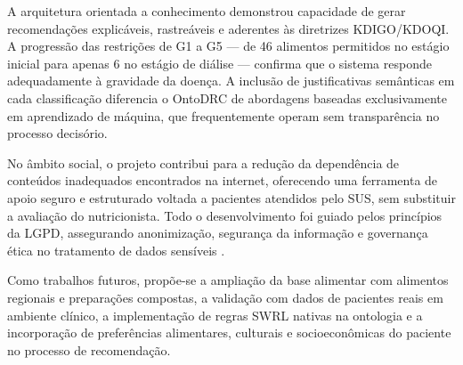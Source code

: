 \documentclass[12pt, a4paper, twocolumn]{article}
\begin{document}
A arquitetura orientada a conhecimento demonstrou capacidade de gerar recomendações explicáveis, rastreáveis e aderentes às diretrizes KDIGO/KDOQI. A progressão das restrições de G1 a G5 --- de 46 alimentos permitidos no estágio inicial para apenas 6 no estágio de diálise --- confirma que o sistema responde adequadamente à gravidade da doença. A inclusão de justificativas semânticas em cada classificação diferencia o OntoDRC de abordagens baseadas exclusivamente em aprendizado de máquina, que frequentemente operam sem transparência no processo decisório.

No âmbito social, o projeto contribui para a redução da dependência de conteúdos inadequados encontrados na internet, oferecendo uma ferramenta de apoio seguro e estruturado voltada a pacientes atendidos pelo SUS, sem substituir a avaliação do nutricionista. Todo o desenvolvimento foi guiado pelos princípios da LGPD, assegurando anonimização, segurança da informação e governança ética no tratamento de dados sensíveis \cite{brasil2018}.

Como trabalhos futuros, propõe-se a ampliação da base alimentar com alimentos regionais e preparações compostas, a validação com dados de pacientes reais em ambiente clínico, a implementação de regras SWRL nativas na ontologia e a incorporação de preferências alimentares, culturais e socioeconômicas do paciente no processo de recomendação.
\end{document}

